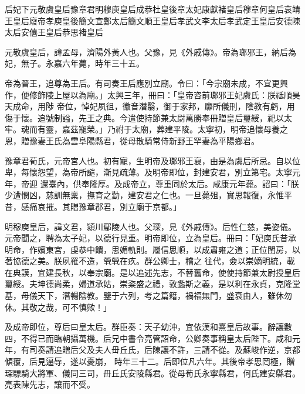 
\begin{pinyinscope}

 后妃下元敬虞皇后豫章君明穆庾皇后成恭杜皇後章太妃康獻褚皇后穆章何皇后哀靖王皇后廢帝孝庾皇後簡文宣鄭太后簡文順王皇后孝武文李太后孝武定王皇后安德陳太后安僖王皇后恭思褚皇后



 元敬虞皇后，諱孟母，濟陽外黃人也。父豫，見《外戚傳》。帝為瑯邪王，納后為妃，無子。永嘉六年薨，時年三十五。



 帝為晉王，追尊為王后。有司奏王后應別立廟。令曰：「今宗廟未成，不宜更興作，便修飾陵上屋以為廟。」太興三年，冊曰：「皇帝咨前瑯邪王妃虞氏：朕祗順昊天成命，用陟
 帝位，悼妃夙徂，徽音潛翳，御于家邦，靡所儀刑，陰教有虧，用傷于懷。追號制謚，先王之典。今遣使持節兼太尉萬勝奉冊贈皇后璽綬，祀以太牢。魂而有靈，嘉茲寵榮。」乃祔于太廟，葬建平陵。太寧初，明帝追懷母養之恩，贈豫妻王氏為雲阜陽縣君，從母散騎常侍新野王罕妻為平陽鄉君。



 豫章君荀氏，元帝宮人也。初有寵，生明帝及瑯邪王裒，由是為虞后所忌。自以位卑，每懷怨望，為帝所譴，漸見疏薄。及明帝即位，封建安君，別立第宅。太寧元年，帝迎
 還臺內，供奉隆厚。及成帝立，尊重同於太后。咸康元年薨。詔曰：「朕少遭憫凶，慈訓無稟，撫育之勤，建安君之仁也。一旦薨殂，實思報復，永惟平昔，感痛哀摧。其贈豫章郡君，別立廟于京都。」



 明穆庾皇后，諱文君，潁川鄢陵人也。父琛，見《外戚傳》。后性仁慈，美姿儀。元帝聞之，聘為太子妃，以德行見重。明帝即位，立為皇后。冊曰：「妃庾氏昔承明命，作嬪東宮，虔恭中饋，思媚軌則。履信思順，以成肅雍之道；正位閨房，以著協德之美。朕夙罹不造，煢煢在疚。群公卿士，稽之
 往代，僉以崇嫡明統，載在典謨，宜建長秋，以奉宗廟。是以追述先志，不替舊命，使使持節兼太尉授皇后璽綬。夫坤德尚柔，婦道承姑，崇粢盛之禮，敦螽斯之義，是以利在永貞，克隆堂基，母儀天下，潛暢陰教。鑒于六列，考之篇籍，禍福無門，盛衰由人，雖休勿休。其敬之哉，可不慎歟！」



 及成帝即位，尊后曰皇太后。群臣奏：天子幼沖，宜依漢和熹皇后故事。辭讓數四，不得已而臨朝攝萬機。后兄中書令亮管詔命，公卿奏事稱皇太后陛下。咸和元年，有司奏請追贈后父及夫人毌丘氏，后陳讓不許，三請不從。及蘇峻作逆，京都傾覆，后見逼辱，遂以憂崩，
 時年三十二。后即位凡六年。其後帝孝思罔極，贈琛驃騎大將軍、儀同三司，毌丘氏安陵縣君。從母荀氏永寧縣君，何氏建安縣君。亮表陳先志，讓而不受。




\end{pinyinscope}
